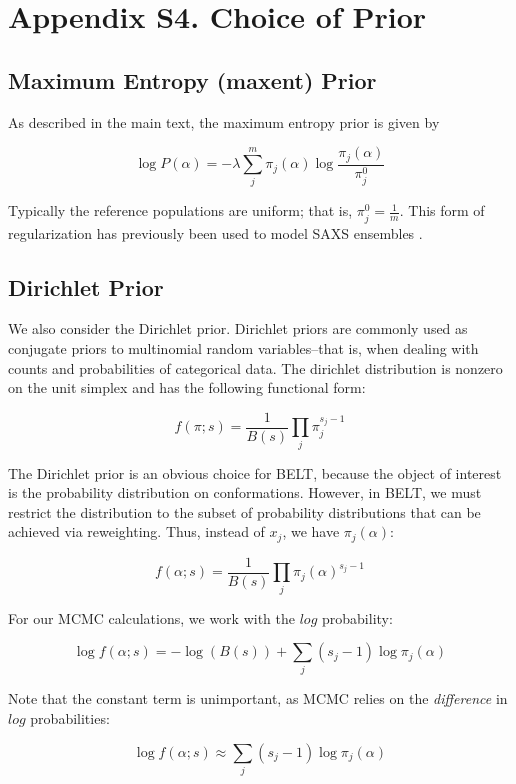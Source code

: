 \documentclass[12pt]{article}
\begin{document}
\newpage

\section*{Appendix S4.  Choice of Prior}

\subsection*{Maximum Entropy (maxent) Prior}

As described in the main text, the maximum entropy prior is given by 

$$\log P(\alpha) = -\lambda \sum_j^m \pi_j(\alpha) \log \frac{\pi_j(\alpha)}{\pi_j^0}$$

Typically the reference populations are uniform; that is, $\pi_j^0 = \frac{1}{m}$.  This form of regularization has previously been used to model SAXS ensembles \cite{rozycki2011saxs}.  

\subsection*{Dirichlet Prior}

We also consider the Dirichlet prior.  Dirichlet priors are commonly used as conjugate priors to multinomial random variables--that is, when dealing with counts and probabilities of categorical data.  The dirichlet distribution is nonzero on the unit simplex and has the following functional form:

$$f(\pi;s) = \frac{1}{B(s)} \prod_j \pi_j^{s_j - 1}$$

The Dirichlet prior is an obvious choice for BELT, because the object of interest is the probability distribution on conformations.  However, in BELT, we must restrict the distribution to the subset of probability distributions that can be achieved via reweighting.  Thus, instead of $x_j$, we have $\pi_j(\alpha)$:

$$f(\alpha;s) = \frac{1}{B(s)} \prod_j \pi_j(\alpha)^{s_j - 1}$$

For our MCMC calculations, we work with the $log$ probability:

$$\log f(\alpha;s) = -\log(B(s)) + \sum_j (s_j - 1) \log \pi_j(\alpha)$$

Note that the constant term is unimportant, as MCMC relies on the \emph{difference} in $log$ probabilities:

$$\log f(\alpha;s) \approx \sum_j (s_j - 1) \log \pi_j(\alpha)$$
\end{document}
